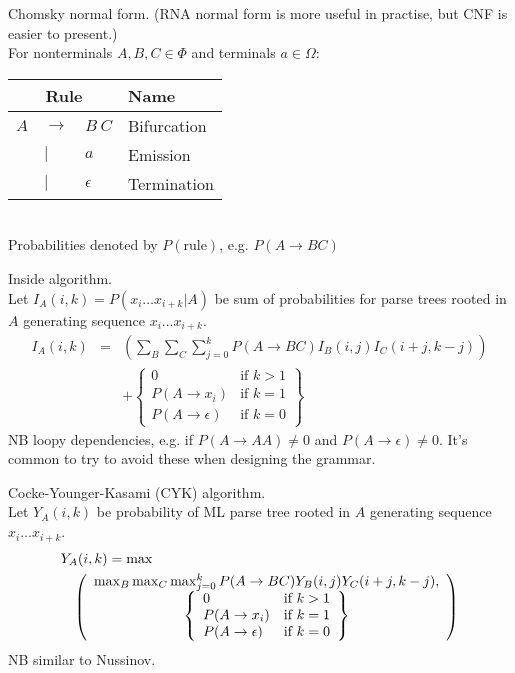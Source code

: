 \documentclass{beamer}
\begin{document}
\begin{frame}{}

\itemb
\item Chomsky normal form. (RNA normal form is more useful in practise, but CNF is easier to present.) \\
For nonterminals $A,B,C \in \Phi$ and terminals $a \in \Omega$:
\begin{tabular}{rll|l}
\multicolumn{3}{c|}{Rule} & Name \\
\hline
$A$ & $\to$ & $B\ C$      & Bifurcation \\
    &   $|$ & $a$         & Emission \\
    &   $|$ & $\epsilon$  & Termination
\end{tabular} \\
Probabilities denoted by $P(\mbox{rule})$, e.g. $P(A \to BC)$
\iteme
\end{frame}
\begin{frame}{}
\itemb
\item Inside algorithm. \\
Let $I_A(i,k) = P(x_i \ldots x_{i+k} | A)$ be sum of probabilities for parse trees rooted in $A$ generating sequence $x_i \ldots x_{i+k}$.
\begin{eqnarray*}
I_A(i,k) & = & \left( \sum_B \sum_C \sum_{j=0}^k P(A \to BC) I_B(i,j) I_C(i+j,k-j) \right)
\\ & &
+ \left\{ \begin{array}{ll}
0 & \mbox{if $k>1$} \\
P(A \to x_i) & \mbox{if $k=1$} \\
P(A \to \epsilon) & \mbox{if $k=0$}
\end{array} \right\}
\end{eqnarray*}
NB loopy dependencies, e.g. if $P(A \to AA) \neq 0$ and $P(A \to \epsilon) \neq 0$.
It's common to try to avoid these when designing the grammar.
\iteme
\end{frame}
\begin{frame}{}
\itemb
\item Cocke-Younger-Kasami (CYK) algorithm. \\
Let $Y_A(i,k)$ be probability of ML parse tree rooted in $A$ generating sequence $x_i \ldots x_{i+k}$.
\begin{eqnarray*}
\lefteqn{Y_A(i,k) = \max} & & \\
& & \left( \begin{array}{c} \max_B \max_C \max_{j=0}^k P(A \to BC) Y_B(i,j) Y_C(i+j,k-j), \\
\left\{ \begin{array}{ll}
0 & \mbox{if $k>1$} \\
P(A \to x_i) & \mbox{if $k=1$} \\
P(A \to \epsilon) & \mbox{if $k=0$}
\end{array} \right\}
\end{array} \right)
\end{eqnarray*}
NB similar to Nussinov.
\iteme
\end{frame}
\end{document}
